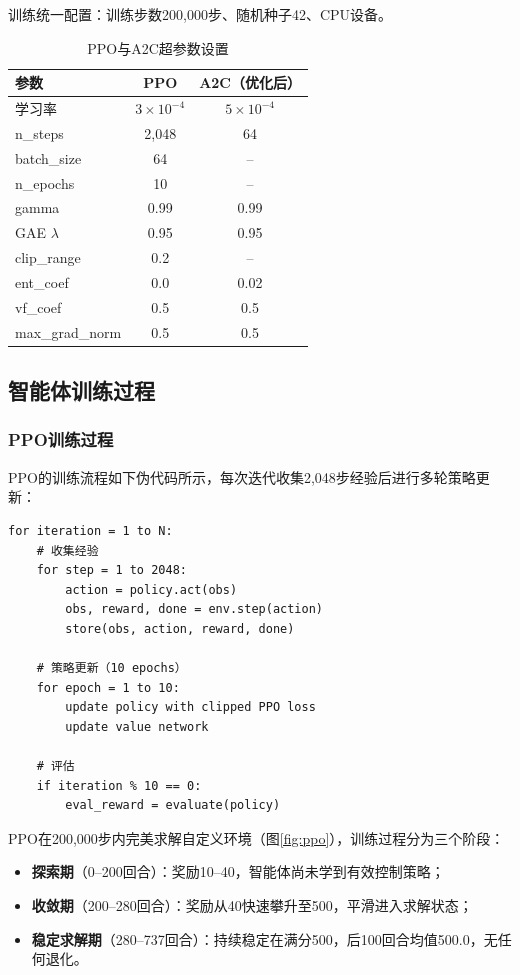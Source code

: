 \documentclass[12pt,a4paper]{ctexart}
\begin{document}
训练统一配置：训练步数200,000步、随机种子42、CPU设备。

\begin{table}[H]
\centering
\caption{PPO与A2C超参数设置}
\label{tab:hyperparams}
\begin{tabular}{lcc}
\toprule
\textbf{参数} & \textbf{PPO} & \textbf{A2C（优化后）} \\
\midrule
学习率 & \(3\times10^{-4}\) & \(5\times10^{-4}\) \\
n\_steps & 2,048 & 64 \\
batch\_size & 64 & -- \\
n\_epochs & 10 & -- \\
gamma & 0.99 & 0.99 \\
GAE \(\lambda\) & 0.95 & 0.95 \\
clip\_range & 0.2 & -- \\
ent\_coef & 0.0 & 0.02 \\
vf\_coef & 0.5 & 0.5 \\
max\_grad\_norm & 0.5 & 0.5 \\
\bottomrule
\end{tabular}
\end{table}

\subsection{智能体训练过程}

\subsubsection{PPO训练过程}

PPO的训练流程如下伪代码所示，每次迭代收集2,048步经验后进行多轮策略更新：

\begin{verbatim}
for iteration = 1 to N:
    # 收集经验
    for step = 1 to 2048:
        action = policy.act(obs)
        obs, reward, done = env.step(action)
        store(obs, action, reward, done)

    # 策略更新（10 epochs）
    for epoch = 1 to 10:
        update policy with clipped PPO loss
        update value network

    # 评估
    if iteration % 10 == 0:
        eval_reward = evaluate(policy)
\end{verbatim}

PPO在200,000步内完美求解自定义环境（图\ref{fig:ppo}），训练过程分为三个阶段：
\begin{itemize}[nosep]
    \item \textbf{探索期}（0--200回合）：奖励10--40，智能体尚未学到有效控制策略；
    \item \textbf{收敛期}（200--280回合）：奖励从40快速攀升至500，平滑进入求解状态；
    \item \textbf{稳定求解期}（280--737回合）：持续稳定在满分500，后100回合均值500.0，无任何退化。
\end{itemize}
\end{document}
